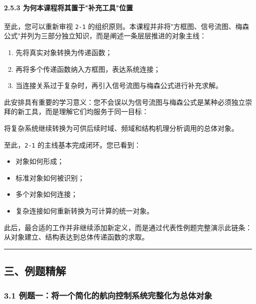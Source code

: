 \documentclass[
  11pt]{article}
\providecommand{\tightlist}{%
  \setlength{\itemsep}{0pt}\setlength{\parskip}{0pt}}
\renewenvironment{quote}
  {\begin{HandoutQuoteBox}\small\color{TitleBlue}\noindent\ignorespaces}
  {\end{HandoutQuoteBox}}
\begin{document}
\paragraph{2.5.3
为何本课程将其置于"补充工具"位置}\label{ux4e3aux4f55ux672cux8bfeux7a0bux5c06ux5176ux7f6eux4e8eux8865ux5145ux5de5ux5177ux4f4dux7f6e}

至此，您可以重新审视 \texttt{2-1}
的组织原则。本课程并非将"方框图、信号流图、梅森公式"并列为三部分独立知识，而是阐述一条层层推进的对象主线：

\begin{enumerate}
\def\labelenumi{\arabic{enumi}.}
\tightlist
\item
  先将真实对象转换为传递函数；
\item
  再将多个传递函数纳入方框图，表达系统连接；
\item
  当连接关系过于复杂时，再引入信号流图与梅森公式进行补充求解。
\end{enumerate}

此安排具有重要的学习意义：您不会误以为信号流图与梅森公式是某种必须独立崇拜的新工具，而是理解它们均服务于同一目标：

\begin{quote}
将复杂系统继续转换为可供后续时域、频域和结构机理分析调用的总体对象。
\end{quote}

至此，\texttt{2-1} 的主线基本完成闭环。您已看到：

\begin{itemize}
\tightlist
\item
  对象如何形成；
\item
  标准对象如何被识别；
\item
  多个对象如何连接；
\item
  复杂连接如何重新转换为可计算的统一对象。
\end{itemize}

此后，最合适的工作并非继续添加新定义，而是通过代表性例题完整演示此链条：从对象建立、结构表达到总体传递函数的求取。

\begin{center}\rule{0.5\linewidth}{0.5pt}\end{center}

\subsection{三、例题精解}\label{ux4e09ux4f8bux9898ux7cbeux89e3}

\subsubsection{3.1
例题一：将一个简化的航向控制系统完整化为总体对象}\label{ux4f8bux9898ux4e00ux5c06ux4e00ux4e2aux7b80ux5316ux7684ux822aux5411ux63a7ux5236ux7cfbux7edfux5b8cux6574ux5316ux4e3aux603bux4f53ux5bf9ux8c61}
\end{document}
